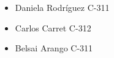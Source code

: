 \documentclass[a4paper, 12pt]{article}
\begin{document}
\begin{center}
\Huge 
\end{center}


\begin{center}

\end{center}
\begin{itemize}
\item Daniela Rodr\'iguez C-311
\item Carlos Carret C-312
\item Belsai Arango C-311
\end{itemize}
\end{document}
